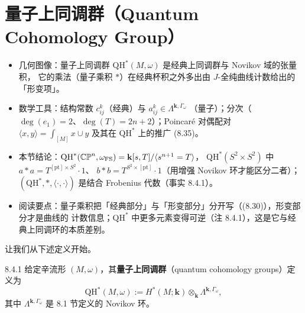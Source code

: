 
\section{量子上同调群（Quantum Cohomology Group）}

\begin{keytakeaways}
\begin{itemize}
  \item 几何图像：量子上同调群 $\mathrm{QH}^*(M,\omega)$ 是经典上同调群与 Novikov 域的张量积，
        它的乘法（量子乘积 $*$）在经典杯积之外多出由 $J$-全纯曲线计数给出的「形变项」。
  \item 数学工具：结构常数 $c_{ij}^k$（经典）与 $a_{ij}^k\in\Lambda^{\mathbf{k},\Gamma_\omega}$
        （量子）；分次（$\deg(e_1)=2$、$\deg(T)=2n+2$）；Poincaré 对偶配对
        $\langle x,y\rangle=\int_{[M]}x\cup y$ 及其在 $\mathrm{QH}^*$ 上的推广 (8.35)。
  \item 本节结论：$\mathrm{QH}^*(\mathbb{CP}^n,\omega_{\mathrm{FS}})=\mathbf{k}[s,T]/\langle s^{n+1}=T\rangle$，
        $\mathrm{QH}^*(S^2\times S^2)$ 中 $a*a=T^{[\mathrm{pt}]\times S^2}\cdot1$、
        $b*b=T^{S^2\times[\mathrm{pt}]}\cdot1$（用增强 Novikov 环才能区分二者）；
        $(\mathrm{QH}^*,*,\langle\cdot,\cdot\rangle)$ 是结合 Frobenius 代数（事实 8.4.1）。
  \item 阅读要点：量子乘积把「经典部分」与「形变部分」分开写（(8.30)），形变部分才是曲线的
        计数信息；$\mathrm{QH}^*$ 中更多元素变得可逆（注 8.4.1），这是它与经典上同调环的本质差别。
\end{itemize}
\end{keytakeaways}

让我们从下述定义开始。

\begin{wdefn}{8.4.1}
  给定辛流形 $(M,\omega)$，其\textbf{量子上同调群}（quantum cohomology groups）定义为
  \[
    \mathrm{QH}^*(M,\omega):=H^*(M;\mathbf{k})\otimes_{\mathbf{k}}
      \Lambda^{\mathbf{k},\Gamma_\omega},
  \]
  其中 $\Lambda^{\mathbf{k},\Gamma_\omega}$ 是 8.1 节定义的 Novikov 环。
\end{wdefn}

